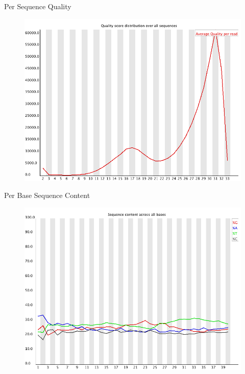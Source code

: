 \begin{frame}{Per Sequence Quality}

\begin{figure}[htbp]
\centering
\includegraphics[width=\textwidth,height=0.8\textheight,keepaspectratio]{images/per_sequence_quality}
\end{figure}

\end{frame}

\begin{frame}{Per Base Sequence Content}

\begin{figure}[htbp]
\centering
\includegraphics[width=\textwidth,height=0.8\textheight,keepaspectratio]{images/per_base_sequence_content}
\end{figure}

\end{frame}

